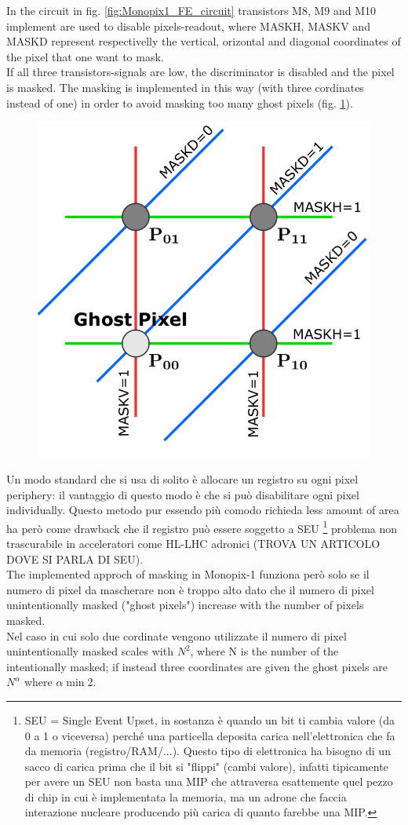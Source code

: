    In the circuit in fig. \ref{fig:Monopix1_FE_circuit} transistors M8, M9 and M10 implement are used to disable pixels-readout, where MASKH, MASKV and MASKD represent respectivelly the vertical, orizontal and diagonal coordinates of the pixel that one want to mask. \\ 
    If all three transistors-signals are low, the discriminator is disabled and the pixel is masked. The masking is implemented in this way (with three cordinates instead of one) in order to avoid masking too many ghost pixels (fig. \ref{fig:masking_scheme}).
    \begin{figure}[h!]
        \centering
        \includegraphics[width=.3\linewidth]{figures/Monopix1/masking_scheme.png}
        \caption{}
        \label{fig:masking_scheme}
    \end{figure}
    Un modo standard che si usa di solito è allocare un registro su ogni pixel periphery: il vantaggio di questo modo è che si può disabilitare ogni pixel individually. Questo metodo pur essendo più comodo richieda less amount of area ha però come drawback che il registro può essere soggetto a SEU \footnote{SEU = Single Event Upset, in sostanza è quando un bit ti cambia valore (da 0 a 1 o viceversa) perché una particella deposita carica nell'elettronica che fa da memoria (registro/RAM/...). Questo tipo di elettronica ha bisogno di un sacco di carica prima che il bit si "flippi" (cambi valore), infatti tipicamente per avere un SEU non basta una MIP che attraversa esattemente quel pezzo di chip in cui è implementata la memoria, ma un adrone che faccia interazione nucleare producendo più carica di quanto farebbe una MIP.} problema non trascurabile in acceleratori come HL-LHC adronici (TROVA UN ARTICOLO DOVE SI PARLA DI SEU).\\
    The implemented approch of masking in Monopix-1 funziona però solo se il numero di pixel da mascherare non è troppo alto dato che il numero di pixel unintentionally masked ("ghost pixels") increase with the number of pixels masked. \\
    Nel caso in cui solo due cordinate vengono utilizzate il numero di pixel unintentionally masked scales with $N^2$, where N is the number of the intentionally masked; if instead three coordinates are given the ghost pixels are $N^\alpha$ where $\alpha \min$2.\\


